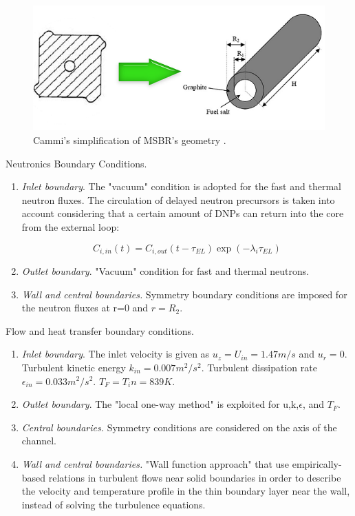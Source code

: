 \documentclass{article}
\begin{document}
\begin{figure}[htpb]
  \centering
  \includegraphics[max height=.5\textheight,max width=\textwidth,keepaspectratio]{Cammi_simplification_1.png}
  \caption{Cammi's simplification of MSBR's geometry
        \cite{cammi_multi-physics_2011}.}
  \label{fig:simlification}
\end{figure}

Neutronics Boundary Conditions.
\begin{enumerate}
	\item \textit{Inlet boundary}. The "vacuum" condition is adopted for the fast and thermal neutron fluxes. The circulation of delayed neutron precursors is taken into account considering that a certain amount of DNPs can return into the core from the external loop:

	\[ C_{i,in}(t) = C_{i,out}(t- \tau_{EL})\exp(- \lambda_i \tau_{EL}) \]
	\item \textit{Outlet boundary}. "Vacuum" condition for fast and thermal neutrons.
	\item \textit{Wall and central boundaries.} Symmetry boundary conditions are imposed for the neutron fluxes at r=0 and $ r=R_2 $.
\end{enumerate}

Flow and heat transfer boundary conditions.
\begin{enumerate}
	\item \textit{Inlet boundary}. The inlet velocity is given as $u_z = U_{in}=1.47 m/s$ and $u_r=0$. Turbulent kinetic energy $k_{in}=0.007 m^2/s^2$. Turbulent dissipation rate $\epsilon_{in}=0.033 m^2/s^2 $. $T_F=T_in=839K$.
	\item \textit{Outlet boundary}. The "local one-way method" is exploited for u,k,$\epsilon$, and $T_F$.
	\item \textit{Central boundaries.} Symmetry conditions are considered on the axis of the channel.
	\item \textit{Wall and central boundaries.} "Wall function approach" that use empirically-based relations in turbulent flows near solid boundaries in order to describe the velocity and temperature profile in the thin boundary layer near the wall, instead of solving the turbulence equations.
\end{enumerate}
\end{document}
